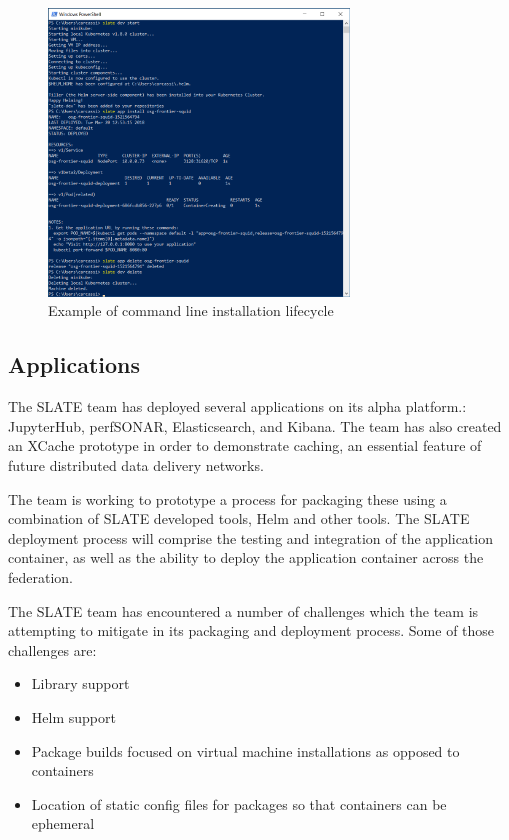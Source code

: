 \documentclass[sigconf]{acmart}
\begin{document}
\begin{figure}
    \centering
    \includegraphics[width=8cm]{commandline_install_lifecycle.png}
    \caption{Example of command line installation lifecycle}
    \label{fig:cli_lifecycle}
\end{figure}

\subsection{Applications}

The SLATE team has deployed several applications on its alpha platform.: JupyterHub, perfSONAR, Elasticsearch, and Kibana.  The team has also created an XCache \cite{XCache} prototype in order to demonstrate caching, an essential feature of future distributed data delivery networks.  

The team is working to prototype a process for packaging these using a combination of SLATE developed tools, Helm and other tools.  The SLATE deployment process will comprise the testing and integration of the application container, as well as the ability to deploy the application container across the federation.
  
The SLATE team has encountered a number of challenges which the team is attempting to mitigate in its packaging and deployment process.  Some of those challenges are:
\begin{itemize}
    \item Library support
    \item Helm support
    \item Package builds focused on virtual machine installations as opposed to containers
    \item Location of static config files for packages so that containers can be ephemeral
\end{itemize}
\end{document}
